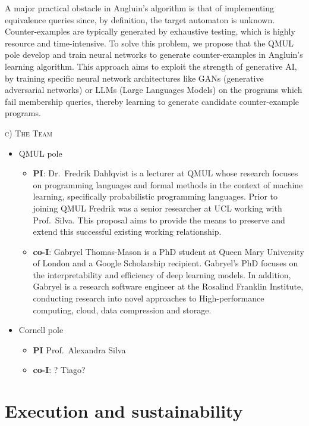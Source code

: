 \documentclass[10pt,a4paper]{article}
\begin{document}
		A major practical obstacle in Angluin's algorithm is that of implementing equivalence queries since, by definition, the target automaton is unknown. Counter-examples are typically generated by exhaustive testing, which is highly resource and time-intensive. To solve this problem, we propose that the  QMUL pole develop and train neural networks to generate counter-examples in Angluin's learning algorithm. This approach aims to exploit the strength of generative AI,  by training specific neural network architectures like GANs (generative adversarial networks) or LLMs (Large Languages Models) on the programs which fail membership queries, thereby learning to generate candidate counter-example programs.
		
		 {
		 	\vspace{3mm}
		 	\noindent \textsc{\large c) The Team}
		 	\vspace{3mm}
		 }
	
		\begin{itemize}
			\item QMUL pole
				\begin{itemize}
					\item \textbf{PI}: Dr.\ Fredrik Dahlqvist is a lecturer at QMUL whose research focuses on programming languages and formal methods in the context of machine learning, specifically probabilistic programming languages. Prior to joining QMUL Fredrik was a senior researcher at UCL working with Prof.\ Silva. This proposal aims to provide the means to preserve and extend this successful existing working relationship.
					\item \textbf{co-I}: Gabryel Thomas-Mason is a PhD student at Queen Mary University of London and a Google Scholarship recipient. Gabryel's PhD focuses on the interpretability and efficiency of deep learning models. In addition, Gabryel is a research software engineer at the Rosalind Franklin Institute, conducting research into novel approaches to High-performance computing, cloud, data compression and storage. 
				\end{itemize}
			\item Cornell pole 
				\begin{itemize}
					\item \textbf{PI} Prof.\ Alexandra Silva 
					\item \textbf{co-I}: ? Tiago?
				\end{itemize}
		\end{itemize}
	
	
	\section{Execution and sustainability}
	
\end{document}
